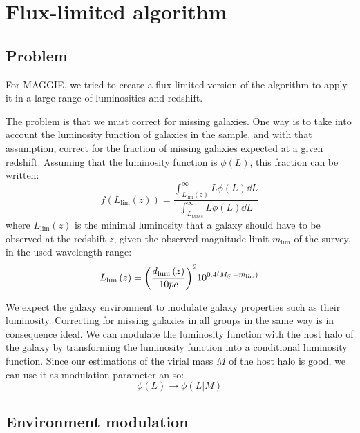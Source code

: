 \section{Flux-limited algorithm}

\subsection{Problem}

For MAGGIE, we tried to create a flux-limited version of the algorithm to
apply it in a large range of luminosities and redshift.

The problem is that we must correct for missing galaxies. One way is to take
into account the luminosity function of galaxies in the sample, and with
that assumption, correct for the fraction of missing galaxies expected at a
given redshift. Assuming that the luminosity function is
$\phi\left(L\right)$, this fraction can be written:
%
\begin{equation}\label{eq:correc}
    f\left({L_{\lim}{\left({z}\right)}}\right)=\frac{\int_{L_{\lim}\left({z}\right)}^{\infty}L\phi{\left({L}\right)}\dd{L}}{\int_{L_{thres}}^{\infty}L\phi{\left({L}\right)}\dd{L}}
\end{equation}
%
where $L_{\lim}\left({z}\right)$ is the minimal luminosity that a galaxy should
have to be observed at the redshift $z$, given the observed magnitude limit
$m_{\lim}$ of the survey, in the used wavelength range:
%
\begin{equation}
    L_{\lim}\left({z}\right)={{\left(\frac{d_{\rm{lum}}\left({z}\right)}{10pc}\right)}^2}10^{0.4\left({M_{\odot}-m_{\lim}}\right)}
\end{equation}
%

We expect the galaxy environment to modulate galaxy properties such as their
luminosity. Correcting for missing galaxies in all groups in the same way is
in consequence ideal. We can modulate the luminosity function with the host
halo of the galaxy by transforming the luminosity function into a
conditional luminosity function. Since our estimations of the virial mass
$M$ of the host halo is good, we can use it as modulation parameter an so:
%
\begin{equation}
    \phi\left({L}\right)\rightarrow\phi\left({L|M}\right)%
\end{equation}

\subsection{Environment modulation}


